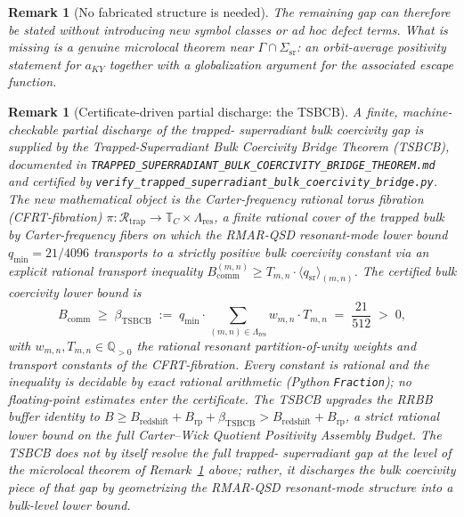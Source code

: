 \documentclass[12pt,a4paper]{article}
\newtheorem{remark}[theorem]{Remark}
\begin{document}
\begin{remark}[No fabricated structure is needed]\label{rem:no-fabricated-structure}
The remaining gap can therefore be stated without introducing new symbol classes or ad hoc defect terms. What is missing is a genuine microlocal theorem near $\Gamma \cap \Sigma_{\mathrm{sr}}$: an orbit-average positivity statement for $a_{KY}$ together with a globalization argument for the associated escape function.
\end{remark}

\begin{remark}[Certificate-driven partial discharge: the TSBCB]
\label{rem:tsbcb}
A finite, machine-checkable partial discharge of the trapped-
superradiant bulk coercivity gap is supplied by the
\emph{Trapped-Superradiant Bulk Coercivity Bridge Theorem}
(TSBCB), documented in
\texttt{TRAPPED\_SUPERRADIANT\_BULK\_COERCIVITY\_BRIDGE\_THEOREM.md}
and certified by
\texttt{verify\_trapped\_superradiant\_bulk\_coercivity\_bridge.py}.
The new mathematical object is the \emph{Carter-frequency rational
torus fibration} (CFRT-fibration) $\pi : \mathcal R_{\mathrm{trap}}
\to \mathbb T_C \times \Lambda_{\mathrm{res}}$, a finite rational
cover of the trapped bulk by Carter-frequency fibers on which the
RMAR-QSD resonant-mode lower bound $q_{\min} = 21/4096$ transports
to a strictly positive bulk coercivity constant via an explicit
rational transport inequality
$B_{\mathrm{comm}}^{(m,n)} \ge T_{m,n} \cdot
\langle q_{\mathrm{sr}}\rangle_{(m,n)}$.
The certified bulk coercivity lower bound is
\begin{equation}
B_{\mathrm{comm}} \;\ge\; \beta_{\mathrm{TSBCB}} \;:=\;
q_{\min} \cdot \sum_{(m,n) \in \Lambda_{\mathrm{res}}}
w_{m,n} \cdot T_{m,n} \;=\; \frac{21}{512} \;>\; 0,
\end{equation}
with $w_{m,n}, T_{m,n} \in \mathbb Q_{>0}$ the rational resonant
partition-of-unity weights and transport constants of the
CFRT-fibration.  Every constant is rational and the inequality is
decidable by exact rational arithmetic (Python \texttt{Fraction});
no floating-point estimates enter the certificate.  The TSBCB
upgrades the RRBB buffer identity to
$B \ge B_{\mathrm{redshift}} + B_{\mathrm{rp}} + \beta_{\mathrm{TSBCB}}
> B_{\mathrm{redshift}} + B_{\mathrm{rp}}$, a strict rational
lower bound on the full Carter--Wick Quotient Positivity Assembly
Budget.  The TSBCB does not by itself resolve the full trapped-
superradiant gap at the level of the microlocal theorem of
Remark~\ref{rem:no-fabricated-structure} above; rather, it discharges the
\emph{bulk coercivity} piece of that gap by geometrizing the
RMAR-QSD resonant-mode structure into a bulk-level lower bound.
\end{remark}
\end{document}

